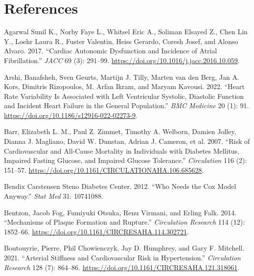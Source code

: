 \documentclass[
  a4paper,
  headsepline=true,
  open=any]{scrbook}
\newlength{\cslhangindent}
\newlength{\cslentryspacingunit} %
\newenvironment{CSLReferences}[2] %
 {%
  \setlength{\parindent}{0pt}
  \ifodd #1
  \let\oldpar\par
  \def\par{\hangindent=\cslhangindent\oldpar}
  \fi
  \setlength{\parskip}{#2\cslentryspacingunit}
 }%
 {}
\begin{document}
\hypertarget{references}{%
\chapter*{References}\label{references}}


\hypertarget{refs}{}
\begin{CSLReferences}{1}{0}
\leavevmode{}%
Agarwal Sunil K., Norby Faye L., Whitsel Eric A., Soliman Elsayed Z.,
Chen Lin Y., Loehr Laura R., Fuster Valentin, Heiss Gerardo, Coresh
Josef, and Alonso Alvaro. 2017. {``Cardiac Autonomic Dysfunction and
Incidence of Atrial Fibrillation.''} \emph{JACC} 69 (3): 291--99.
\url{https://doi.org/10.1016/j.jacc.2016.10.059}.

\leavevmode{}%
Arshi, Banafsheh, Sven Geurts, Martijn J. Tilly, Marten van den Berg,
Jan A. Kors, Dimitris Rizopoulos, M. Arfan Ikram, and Maryam Kavousi.
2022. {``Heart Rate Variability Is Associated with Left Ventricular
Systolic, Diastolic Function and Incident Heart Failure in the General
Population.''} \emph{BMC Medicine} 20 (1): 91.
\url{https://doi.org/10.1186/s12916-022-02273-9}.

\leavevmode{}%
Barr, Elizabeth L. M., Paul Z. Zimmet, Timothy A. Welborn, Damien
Jolley, Dianna J. Magliano, David W. Dunstan, Adrian J. Cameron, et al.
2007. {``Risk of Cardiovascular and All-Cause Mortality in Individuals
with Diabetes Mellitus, Impaired Fasting Glucose, and Impaired Glucose
Tolerance.''} \emph{Circulation} 116 (2): 151--57.
\url{https://doi.org/10.1161/CIRCULATIONAHA.106.685628}.

\leavevmode{}%
Bendix Carstensen Steno Diabetes Center. 2012. {``Who Needs the Cox
Model Anyway.''} \emph{Stat Med} 31: 10741088.

\leavevmode{}%
Bentzon, Jacob Fog, Fumiyuki Otsuka, Renu Virmani, and Erling Falk.
2014. {``Mechanisms of Plaque Formation and Rupture.''}
\emph{Circulation Research} 114 (12): 1852--66.
\url{https://doi.org/10.1161/CIRCRESAHA.114.302721}.

\leavevmode{}%
Boutouyrie, Pierre, Phil Chowienczyk, Jay D. Humphrey, and Gary F.
Mitchell. 2021. {``Arterial Stiffness and Cardiovascular Risk in
Hypertension.''} \emph{Circulation Research} 128 (7): 864--86.
\url{https://doi.org/10.1161/CIRCRESAHA.121.318061}.


\end{CSLReferences}
\end{document}

